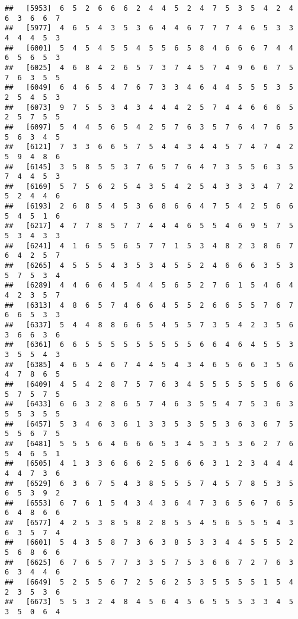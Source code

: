 \documentclass[
]{book}
\begin{document}
\begin{verbatim}
##   [5953]  6  5  2  6  6  6  2  4  4  5  2  4  7  5  3  5  4  2  4  6  3  6  6  7
##   [5977]  4  6  5  4  3  5  3  6  4  4  6  7  7  7  4  6  5  3  3  4  4  4  5  3
##   [6001]  5  4  5  4  5  5  4  5  5  6  5  8  4  6  6  6  7  4  4  6  5  6  5  3
##   [6025]  4  6  8  4  2  6  5  7  3  7  4  5  7  4  9  6  6  7  5  7  6  3  5  5
##   [6049]  6  4  6  5  4  7  6  7  3  3  4  6  4  4  5  5  5  3  5  2  5  4  5  3
##   [6073]  9  7  5  5  3  4  3  4  4  4  2  5  7  4  4  6  6  6  5  2  5  7  5  5
##   [6097]  5  4  4  5  6  5  4  2  5  7  6  3  5  7  6  4  7  6  5  5  6  3  4  5
##   [6121]  7  3  3  6  6  5  7  5  4  4  3  4  4  5  7  4  7  4  2  5  9  4  8  6
##   [6145]  3  5  8  5  5  3  7  6  5  7  6  4  7  3  5  5  6  3  5  7  4  4  5  3
##   [6169]  5  7  5  6  2  5  4  3  5  4  2  5  4  3  3  3  4  7  2  5  2  4  4  6
##   [6193]  2  6  8  5  4  5  3  6  8  6  6  4  7  5  4  2  5  6  6  5  4  5  1  6
##   [6217]  4  7  7  8  5  7  7  4  4  4  6  5  5  4  6  9  5  7  5  5  3  4  3  3
##   [6241]  4  1  6  5  5  6  5  7  7  1  5  3  4  8  2  3  8  6  7  6  4  2  5  7
##   [6265]  4  5  5  5  4  3  5  3  4  5  5  2  4  6  6  6  3  5  3  5  7  5  3  4
##   [6289]  4  4  6  6  4  5  4  4  5  6  5  2  7  6  1  5  4  6  4  4  2  3  5  7
##   [6313]  4  8  6  5  7  4  6  6  4  5  5  2  6  6  5  5  7  6  7  6  6  5  3  3
##   [6337]  5  4  4  8  8  6  6  5  4  5  5  7  3  5  4  2  3  5  6  3  6  6  3  6
##   [6361]  6  6  5  5  5  5  5  5  5  5  5  6  6  4  6  4  5  5  3  3  5  5  4  3
##   [6385]  4  6  5  4  6  7  4  4  5  4  3  4  6  5  6  6  3  5  6  4  7  8  6  5
##   [6409]  4  5  4  2  8  7  5  7  6  3  4  5  5  5  5  5  5  6  6  5  7  5  7  5
##   [6433]  6  6  3  2  8  6  5  7  4  6  3  5  5  4  7  5  3  6  3  5  5  3  5  5
##   [6457]  5  3  4  6  3  6  1  3  3  5  3  5  5  3  6  3  6  7  5  5  5  6  7  5
##   [6481]  5  5  5  6  4  6  6  6  5  3  4  5  3  5  3  6  2  7  6  5  4  6  5  1
##   [6505]  4  1  3  3  6  6  6  2  5  6  6  6  3  1  2  3  4  4  4  4  4  7  3  6
##   [6529]  6  3  6  7  5  4  3  8  5  5  5  7  4  5  7  8  5  3  5  6  5  3  9  2
##   [6553]  6  7  6  1  5  4  3  4  3  6  4  7  3  6  5  6  7  6  5  6  4  8  6  6
##   [6577]  4  2  5  3  8  5  8  2  8  5  5  4  5  6  5  5  5  4  3  6  3  5  7  4
##   [6601]  5  4  3  5  8  7  3  6  3  8  5  3  3  4  4  5  5  5  2  5  6  8  6  6
##   [6625]  6  7  6  5  7  7  3  3  5  7  5  3  6  6  7  2  7  6  3  6  3  4  4  6
##   [6649]  5  2  5  5  6  7  2  5  6  2  5  3  5  5  5  5  1  5  4  2  3  5  3  6
##   [6673]  5  5  3  2  4  8  4  5  6  4  5  6  5  5  5  3  3  4  5  3  5  0  6  4

\end{verbatim}
\end{document}

